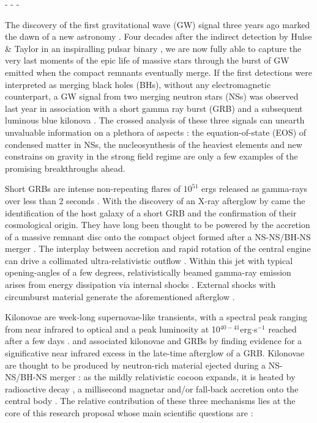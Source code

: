 \documentclass[12pt,onecolumn]{article}
\makeatletter
\newcommand{\gw}{GW\xspace}
\newcommand{\grb}{GRB\xspace}
\newcommand{\grbs}{GRBs\xspace}
\newcommand{\eos}{EOS\xspace}
\newcommand*{\ns}{NS\@\xspace}
\newcommand*{\nss}{NSs\@\xspace}
\newcommand*{\bh}{BH\@\xspace}
\newcommand*{\bhs}{BHs\@\xspace}
\makeatother
\begin{document}
- - -

The discovery of the first gravitational wave (\gw) signal three years ago marked the dawn of a new astronomy \cite{Abbott2016}. Four decades after the indirect detection by Hulse \& Taylor in an inspiralling pulsar binary \cite{Hulse1974}, we are now fully able to capture the very last moments of the epic life of massive stars through the burst of \gw emitted when the compact remnants eventually merge. If the first detections were interpreted as merging black holes (\bhs), without any electromagnetic counterpart, a \gw signal from two merging neutron stars (\nss) was observed last year in association with a short gamma ray burst (\grb) and a subsequent luminous blue kilonova \cite{TheLIGOScientificCollaboration2017}. The crossed analysis of these three signals can unearth unvaluable information on a plethora of aspects : the equation-of-state (\eos) of condensed matter in \nss, the nucleosynthesis of the heaviest elements and new constrains on gravity in the strong field regime are only a few examples of the promising breakthroughs ahead.

Short \grbs are intense non-repeating flares of $10^{51}$ ergs released as gamma-rays over less than 2 seconds \cite{Berger2014}. With the discovery of an X-ray afterglow by \cite{Gehrels2005} came the identification of the host galaxy of a short \grb and the confirmation of their cosmological origin. They have long been thought to be powered by the accretion of a massive remnant disc onto the compact object formed after a \ns-\ns/\bh-\ns merger \cite{Eichler1989}. The interplay between accretion and rapid rotation of the central engine can drive a collimated ultra-relativistic outflow \cite{Piran2005}. Within this jet with typical opening-angles of a few degrees, relativistically beamed gamma-ray emission arises from energy dissipation via internal shocks \cite{Rees1992}. External shocks with circumburst material generate the aforementioned afterglow \cite{Kumar2015}.

Kilonovae are week-long supernovae-like transients, with a spectral peak ranging from near infrared to optical and a peak luminosity at 10$^{40-41}$erg$\cdot$s$^{-1}$ reached after a few days \cite{Tanaka2016,Metzger2017}. \cite{Tanvir2013} and \cite{Berger2013} associated kilonovae and \grbs by finding evidence for a significative near infrared excess in the late-time afterglow of a \grb. Kilonovae are thought to be produced by neutron-rich material ejected during a \ns-\ns/\bh-\ns merger : as the mildly relativistic cocoon expands, it is heated by radioactive decay \cite{Li1998}, a millisecond magnetar \cite{Yu2013} and/or fall-back accretion onto the central body \cite{Rosswog2007}. The relative contribution of these three mechanisms lies at the core of this research proposal whose main scientific questions are :
\end{document}
